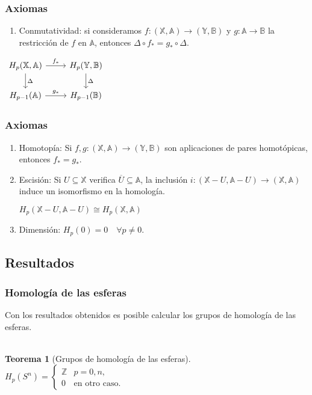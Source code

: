 \documentclass{beamer}
\def\X{{\mathbb X}}
\def\A{{\mathbb A}}
\def\Y{{\mathbb Y}}
\def\B{{\mathbb B}}
\theoremstyle{theorem}
\newtheorem{mytheorem}{Teorema}
\newcounter{saveenumi}
\newcommand{\seti}{\setcounter{saveenumi}{\value{enumi}}}
\newcommand{\conti}{\setcounter{enumi}{\value{saveenumi}}}
\begin{document}
\begin{frame}[fragile]
  \frametitle{Axiomas}
  \begin{enumerate}
    \conti
    \item Conmutatividad: si consideramos $f \colon (\X, \A) \to (\Y, \B)$ y $g \colon \A \to \B$ la restricción de $f$ en $\A$,
          entonces $\Delta \circ f_* = g_* \circ \Delta$.
    \seti
    \end{enumerate}
    \begin{center}
      $ \begin{tikzcd}
        H_p(\X, \A) \arrow{r}{f_*} \arrow{d}{\Delta} & H_p(\Y, \B) \arrow{d}{\Delta} \\
        H_{p-1}(\A) \arrow{r}{g_*} & H_{p-1}(\B)
      \end{tikzcd} $
    \end{center}

\end{frame}

\begin{frame}
  \frametitle{Axiomas}
  \begin{enumerate}
    \conti
      \item Homotopía: Si $f, g \colon (\X, \A) \to (\Y, \B)$ son aplicaciones de pares homotópicas, entonces $f_* = g_*$.
      \item Escisión: Si $U \subseteq \X$ verifica $\overline{U} \subseteq \A$, la inclusión $i \colon (\X - U, \A - U) \to (\X, \A)$
            induce un isomorfismo en la homología.
            \begin{center}
              $H_p(\X - U, \A - U) \cong H_p(\X, \A)$
            \end{center}
      \item Dimensión: $H_p(0) = 0 \quad \forall p \neq 0.$

    \seti
  \end{enumerate}
\end{frame}


\subsection{Resultados}

\begin{frame}
  \frametitle{Homología de las esferas}
  Con los resultados obtenidos es posible calcular los grupos de homología de las esferas. \\~\\

  \begin{mytheorem}[Grupos de homología de las esferas]
    $H_p(S^n) = \begin{cases} \mathbb Z & p = 0, n,\\
                                      0 & \text{en otro caso.} \end{cases}$
  \end{mytheorem}
\end{frame}
\end{document}
